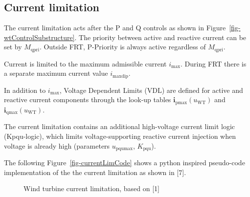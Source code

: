 \documentclass[
  a4paper,
  DIV=11,
  numbers=noendperiod]{scrartcl}
\begin{document}
\subsection{Current limitation}\label{current-limitation}

The current limitation acts after the P and Q controls as shown in
Figure~\ref{fig-wtControlSubstructure}. The priority between active and
reactive current can be set by \(M_\mathrm{qpri}\). Outside FRT,
P-Priority is always active regardless of \(M_\mathrm{qpri}\).

Current is limited to the maximum admissible current \(i_\mathrm{max}\).
During FRT there is a separate maximum current value
\(i_\mathrm{maxdip}\).

In addition to \(i_\mathrm{max}\), Voltage Dependent Limits (VDL) are
defined for active and reactive current components through the look-up
tables \(\mathbf{i_\mathrm{pmax}}(u_\mathrm{WT})\) and
\(\mathbf{i_\mathrm{qmax}}(u_\mathrm{WT})\).

The current limitation contains an additional high-voltage current limit
logic (Kpqu-logic), which limits voltage-supporting reactive current
injection when voltage is already high (parameters
\(u_\mathrm{pqumax}\), \(K_\mathrm{pqu}\)).

The following Figure~\ref{fig-currentLimCode} shows a python inspired
pseudo-code implementation of the the current limitation as shown in
{[}7{]}.

\begin{figure}


\caption{\label{fig-WTCurrentLim}Wind turbine current limitation, based
on {[}1{]}}

\end{figure}%
\end{document}
